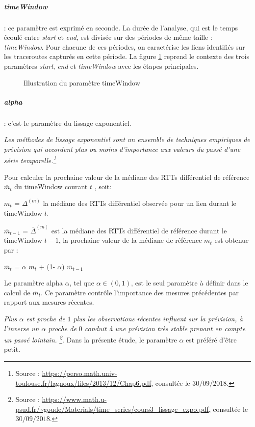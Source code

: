 \subparagraph{timeWindow} :  ce paramètre est exprimé en seconde. La durée de l'analyse, qui est le temps écoulé entre \textit{start} et \textit{end}, est divisée sur des périodes de même taille : \textit{timeWindow}. Pour chacune de ces périodes, on caractérise les liens identifiés sur les traceroutes capturés en cette période. La figure \ref{fig:timewindow} reprend le contexte des trois paramètres \textit{start}, \textit{end} et \textit{timeWindow} avec les étapes principales.

\begin{figure}[h]
	
	\centering
	\resizebox{\textwidth}{!}{
		 
	}
	\caption{Illustration du paramètre timeWindow}
	\label{fig:timewindow}
\end{figure}


\subparagraph{alpha}: c'est le paramètre du lissage exponentiel.

\guillemotleft \textit{ Les méthodes de lissage exponentiel  sont un ensemble de techniques empiriques de prévision qui accordent plus ou moins d'importance aux valeurs du passé d'une série temporelle.\footnote{Source : \url{https://perso.math.univ-toulouse.fr/lagnoux/files/2013/12/Chap6.pdf}, consultée le $30/09/2018.$}} \guillemotright

Pour calculer la prochaine  valeur de la médiane des RTTs différentiel de référence $ \overline{m}_{t}$ du timeWindow  courant $ t $ , soit: 

 $m_t$ = $\Delta^{(m)}$ la médiane des RTTs différentiel observée pour un lien durant le timeWindow $t$. 
 
 $ \overline{m}_{t-1}$ = $ \overline{\Delta}^{(m)}$ est la médiane des  RTTs différentiel  de référence durant le timeWindow $ t-1 $,  la prochaine  valeur de la médiane de référence $ \overline{m}_{t}$ est obtenue par : 

\begin{center}
	$ \overline{m}_{t}$ =  $\alpha$ ${m}_{t}$ + (1-  $\alpha$) $ \overline{m}_{t-1}$
\end{center}

Le paramètre alpha $\alpha$, tel que  $\alpha \in (0, 1)$, est le seul paramètre à définir dans le calcul de $ \overline{m}_{t}$.  Ce paramètre contrôle l'importance  des mesures précédentes par rapport aux mesures récentes.

\guillemotleft \textit{Plus $\alpha$ est proche de $ 1 $ plus les observations récentes influent sur la prévision, à l'inverse un $\alpha$ proche de $0$ conduit à une prévision très stable prenant en compte un passé lointain. \footnote{Source : \url{https://www.math.u-psud.fr/~goude/Materials/time_series/cours3_lissage_expo.pdf}, consultée le $30/09/2018$.}}\guillemotright.  Dans la présente étude, le paramètre $\alpha$ est préféré d'être petit.





